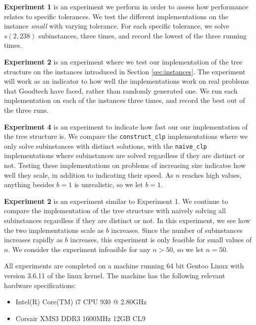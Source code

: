 \textbf{Experiment 1} is an experiment we perform in order to assess
how performance relates to specific tolerances. We test the different
implementations on the instance \textit{small} with varying tolerance.
For each specific tolerance, we solve $s(2, 238)$ subinstances, three times,
and record the lowest of the three running times.

\textbf{Experiment 2} is an experiment where we test our implementation of the
tree structure on the instances introduced in Section \ref{sec:instances}.
The experiment will work as an indicator to how well the implementations work
on real problems that Goodtech have faced, rather than randomly generated one.
We run each implementation on each of the instances three times, and record
the best out of the three runs.

\textbf{Experiment 4} is an experiment to indicate how fast our
our implementation of the tree structure is. We compare the
\texttt{construct\_clp} implementations where we only solve subinstances
with distinct solutions, with the \texttt{naive\_clp} implementations where
subinstances are solved regardless if they are distinct or not. Testing these
implementations on problems of increasing size indicates how well they scale,
in addition to indicating their speed. 
As $n$ reaches high values, anything besides $b = 1$ is unrealistic, so we
let $b = 1$.

\textbf{Experiment 2} is an experiment similar to Experiment 1. We continue
to compare the implementation of the tree structure with naively solving all
subinstances regardless if they are distinct or not. In this experiment, we
see how the two implementations scale as $b$ increases. Since the number
of subinstances increases rapidly as $b$ increases, this experiment is only
feasible for small values of $n$. We consider the experiment infeasible for
any $n > 50$, so we let $n = 50$.

All experiments are completed on a machine running 64 bit Gentoo Linux
with version 3.6.11 of the linux kernel. The machine has the following
relevant hardware specifications:
\begin{itemize}
    \item Intel(R) Core(TM) i7 CPU 930 @ 2.80GHz
    \item Corsair XMS3 DDR3 1600MHz 12GB CL9
\end{itemize}
